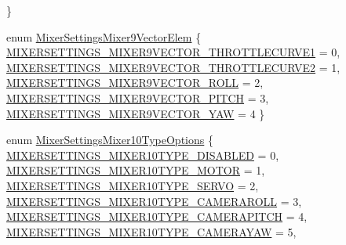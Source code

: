 \begin{DoxyCompactItemize}
 \}
\item 
enum \hyperlink{group___mixer_settings_ga33ae493a244b6838f6c10e7ec8b507b1}{\-Mixer\-Settings\-Mixer9\-Vector\-Elem} \{ \*
\hyperlink{group___mixer_settings_gga33ae493a244b6838f6c10e7ec8b507b1a031def98f54e389370f1edea1b911893}{\-M\-I\-X\-E\-R\-S\-E\-T\-T\-I\-N\-G\-S\-\_\-\-M\-I\-X\-E\-R9\-V\-E\-C\-T\-O\-R\-\_\-\-T\-H\-R\-O\-T\-T\-L\-E\-C\-U\-R\-V\-E1} = 0, 
\hyperlink{group___mixer_settings_gga33ae493a244b6838f6c10e7ec8b507b1abb5ca636eec584338ce80e210f8a09d2}{\-M\-I\-X\-E\-R\-S\-E\-T\-T\-I\-N\-G\-S\-\_\-\-M\-I\-X\-E\-R9\-V\-E\-C\-T\-O\-R\-\_\-\-T\-H\-R\-O\-T\-T\-L\-E\-C\-U\-R\-V\-E2} = 1, 
\hyperlink{group___mixer_settings_gga33ae493a244b6838f6c10e7ec8b507b1abebfd5e089fc2c0729a6214382ca8efd}{\-M\-I\-X\-E\-R\-S\-E\-T\-T\-I\-N\-G\-S\-\_\-\-M\-I\-X\-E\-R9\-V\-E\-C\-T\-O\-R\-\_\-\-R\-O\-L\-L} = 2, 
\hyperlink{group___mixer_settings_gga33ae493a244b6838f6c10e7ec8b507b1ababc7a35da1fbbf71e6a536b4687689d}{\-M\-I\-X\-E\-R\-S\-E\-T\-T\-I\-N\-G\-S\-\_\-\-M\-I\-X\-E\-R9\-V\-E\-C\-T\-O\-R\-\_\-\-P\-I\-T\-C\-H} = 3, 
\*
\hyperlink{group___mixer_settings_gga33ae493a244b6838f6c10e7ec8b507b1ac76d04670f1fe8fcda1fd14290f37ff9}{\-M\-I\-X\-E\-R\-S\-E\-T\-T\-I\-N\-G\-S\-\_\-\-M\-I\-X\-E\-R9\-V\-E\-C\-T\-O\-R\-\_\-\-Y\-A\-W} = 4
 \}
\item 
enum \hyperlink{group___mixer_settings_gacb95e265969c6af8acb25da490000536}{\-Mixer\-Settings\-Mixer10\-Type\-Options} \{ \*
\hyperlink{group___mixer_settings_ggacb95e265969c6af8acb25da490000536ab4992e7402f6ec0e47c9c913a1b3250f}{\-M\-I\-X\-E\-R\-S\-E\-T\-T\-I\-N\-G\-S\-\_\-\-M\-I\-X\-E\-R10\-T\-Y\-P\-E\-\_\-\-D\-I\-S\-A\-B\-L\-E\-D} = 0, 
\hyperlink{group___mixer_settings_ggacb95e265969c6af8acb25da490000536a435391914371b5c8e86910aae000c848}{\-M\-I\-X\-E\-R\-S\-E\-T\-T\-I\-N\-G\-S\-\_\-\-M\-I\-X\-E\-R10\-T\-Y\-P\-E\-\_\-\-M\-O\-T\-O\-R} = 1, 
\hyperlink{group___mixer_settings_ggacb95e265969c6af8acb25da490000536abea36eeeedb6fba0ab04a43852e13da4}{\-M\-I\-X\-E\-R\-S\-E\-T\-T\-I\-N\-G\-S\-\_\-\-M\-I\-X\-E\-R10\-T\-Y\-P\-E\-\_\-\-S\-E\-R\-V\-O} = 2, 
\hyperlink{group___mixer_settings_ggacb95e265969c6af8acb25da490000536a93bfe8a401f2cbad822362f4f6a16ac6}{\-M\-I\-X\-E\-R\-S\-E\-T\-T\-I\-N\-G\-S\-\_\-\-M\-I\-X\-E\-R10\-T\-Y\-P\-E\-\_\-\-C\-A\-M\-E\-R\-A\-R\-O\-L\-L} = 3, 
\*
\hyperlink{group___mixer_settings_ggacb95e265969c6af8acb25da490000536a85f3da0d51015c6c9b942609ec8947d0}{\-M\-I\-X\-E\-R\-S\-E\-T\-T\-I\-N\-G\-S\-\_\-\-M\-I\-X\-E\-R10\-T\-Y\-P\-E\-\_\-\-C\-A\-M\-E\-R\-A\-P\-I\-T\-C\-H} = 4, 
\hyperlink{group___mixer_settings_ggacb95e265969c6af8acb25da490000536a461b1ce2537c7cce51370fb62a4b10c6}{\-M\-I\-X\-E\-R\-S\-E\-T\-T\-I\-N\-G\-S\-\_\-\-M\-I\-X\-E\-R10\-T\-Y\-P\-E\-\_\-\-C\-A\-M\-E\-R\-A\-Y\-A\-W} = 5, 

\end{DoxyCompactItemize}
